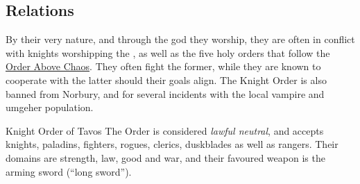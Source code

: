 \subsection{Relations}

By their very nature, and through the god they worship, they are often in
conflict with knights worshipping the , as well as
the five holy orders that follow the \hyperref[sec:Order]{Order Above Chaos}.
They often fight the former, while they are known to cooperate with the latter
should their goals align. The Knight Order is also banned from Norbury, and
 for several incidents with the local vampire and
umgeher population.

\begin{35e}{Knight Order of Tavos}
  The Order is considered \emph{lawful neutral}, and accepts knights, paladins,
  fighters, rogues, clerics, duskblades as well as rangers. Their domains
  are strength, law, good and war, and their favoured weapon is the arming
  sword (``long sword'').
\end{35e}
